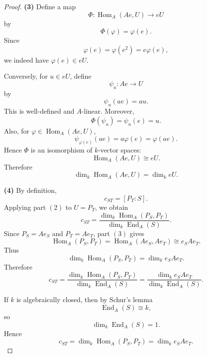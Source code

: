 \begin{proof}
    \medskip

    \noindent
    \textbf{(3)}
    Define a map
    \[
        \Phi:\operatorname{Hom}_A(Ae,U)\longrightarrow eU
    \]
    by
    \[
        \Phi(\varphi)=\varphi(e).
    \]
    Since
    \[
        \varphi(e)=\varphi(e^2)=e\varphi(e),
    \]
    we indeed have \(\varphi(e)\in eU\).

    Conversely, for \(u\in eU\), define
    \[
        \psi_u:Ae\longrightarrow U
    \]
    by
    \[
        \psi_u(ae)=au.
    \]
    This is well-defined and \(A\)-linear. Moreover,
    \[
        \Phi(\psi_u)=\psi_u(e)=u.
    \]
    Also, for \(\varphi\in\operatorname{Hom}_A(Ae,U)\),
    \[
        \psi_{\varphi(e)}(ae)=a\varphi(e)=\varphi(ae).
    \]
    Hence \(\Phi\) is an isomorphism of \(k\)-vector spaces:
    \[
        \operatorname{Hom}_A(Ae,U)\cong eU.
    \]
    Therefore
    \[
        \dim_k \operatorname{Hom}_A(Ae,U)=\dim_k eU.
    \]

    \medskip

    \noindent
    \textbf{(4)}
    By definition,
    \[
        c_{ST}=[P_T:S].
    \]
    Applying part \((2)\) to \(U=P_T\), we obtain
    \[
        c_{ST}
        =
        \frac{\dim_k\operatorname{Hom}_A(P_S,P_T)}
        {\dim_k\operatorname{End}_A(S)}.
    \]
    Since \(P_S=Ae_S\) and \(P_T=Ae_T\), part \((3)\) gives
    \[
        \operatorname{Hom}_A(P_S,P_T)
        =
        \operatorname{Hom}_A(Ae_S,Ae_T)
        \cong
        e_SAe_T.
    \]
    Thus
    \[
        \dim_k\operatorname{Hom}_A(P_S,P_T)
        =
        \dim_k e_SAe_T.
    \]
    Therefore
    \[
        c_{ST}
        =
        \frac{\dim_k \operatorname{Hom}_A(P_S,P_T)}
        {\dim_k \operatorname{End}_A(S)}
        =
        \frac{\dim_k e_SAe_T}
        {\dim_k \operatorname{End}_A(S)}.
    \]

    If \(k\) is algebraically closed, then by Schur's lemma
    \[
        \operatorname{End}_A(S)\cong k,
    \]
    so
    \[
        \dim_k\operatorname{End}_A(S)=1.
    \]
    Hence
    \[
        c_{ST}
        =
        \dim_k \operatorname{Hom}_A(P_S,P_T)
        =
        \dim_k e_SAe_T.
    \]
\end{proof}

